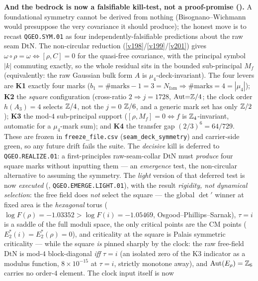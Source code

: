 \par\smallskip\noindent\textbf{And the bedrock is now a falsifiable kill-test, not a proof-promise
().} A foundational symmetry cannot be derived from nothing
(Bisognano--Wichmann would presuppose the very covariance it should produce); the honest move is to recast
\texttt{QGEO.SYM.01} as four independently-falsifiable predictions about the raw seam DtN. The non-circular
reduction (\vref{v198}/\vref{v199}/\vref{v201}) gives $\omega{\circ}\rho{=}\omega\Leftrightarrow[\rho,C]{=}0$
for the quasi-free covariance, with the principal symbol $|k|$ commuting exactly, so the whole residual sits
in the bounded sub-principal $M_f$ (equivalently: the raw Gaussian bulk form $A$ is $\mu_4$-deck-invariant).
The four levers are \textbf{K1} exactly four marks ($b_1{=}\#\text{marks}{-}1{=}3{=}N_{\mathrm{fam}}\Rightarrow
\#\text{marks}{=}4{=}|\mu_4|$); \textbf{K2} the \emph{square} configuration (cross-ratio $2\Rightarrow
j{=}1728$, $\mathrm{Aut}{=}\mathbb Z/4$; the clock order $h(A_3){=}4$ selects $\mathbb Z/4$, not the $j{=}0$ $\mathbb Z/6$, and a
generic mark set has only $\mathbb Z/2$); \textbf{K3} the mod-$4$ sub-principal support ($[\rho,M_f]{=}0\Leftrightarrow
f$ is $\mathbb Z_4$-invariant, automatic for a $\mu_4$-mark sum); and \textbf{K4} the transfer gap $(2/3)^6{=}64/729$.
These are frozen in \texttt{freeze\_file.csv} (\texttt{seam\_deck\_symmetry}) and carrier-side green, so any
future drift fails the suite. The \emph{decisive} kill is deferred to \texttt{QGEO.REALIZE.01}: a
first-principles raw-seam-collar DtN must \emph{produce} four square marks without inputting them --- an
\emph{emergence} test, the non-circular alternative to assuming the symmetry. The \emph{light} version of
that deferred test is now \emph{executed} (,
\texttt{QGEO.EMERGE.LIGHT.01}), with the result \emph{rigidity, not dynamical selection}: the free field
does \emph{not} select the square --- the global $\det{}'$ winner at fixed area is the \emph{hexagonal}
torus ($\log F(\rho)=-1.03352>\log F(i)=-1.05469$, Osgood--Phillips--Sarnak), $\tau=i$ is a saddle of the
full moduli space, the only critical points are the CM points ($E_2^*(i)=E_2^*(\rho)=0$), and criticality
at the square is Palais symmetric criticality --- while the square \emph{is} pinned sharply by the clock:
the raw free-field DtN is mod-$4$ block-diagonal \emph{iff} $\tau=i$ (an isolated zero of the K3
indicator as a modulus function, $8\times10^{-15}$ at $\tau=i$, strictly monotone away), and
$\mathrm{Aut}(E_\rho)=\mathbb Z_6$ carries no order-$4$ element. The clock input itself is now
